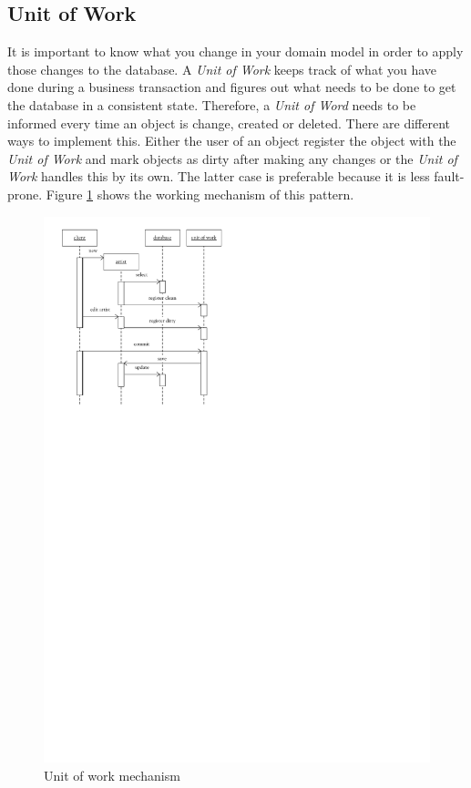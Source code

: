 		\subsection{Unit of Work}
		\label{subsec:unitOfWork}
			It is important to know what you change in your domain model in order to apply those
			changes to the database. A \textit{Unit of Work} keeps track of what you have done
			during a business transaction and figures out what needs to be done to get the
			database in a consistent state. Therefore, a \textit{Unit of Word} needs to be informed
			every time an object is change, created or deleted. There are different ways to
			implement this. Either the user of an object register the object with the 
			\textit{Unit of Work} and mark objects as dirty after making any changes or
			the \textit{Unit of Work} handles this by its own. The latter case is preferable
			because it is less fault-prone. Figure \ref{fig:patternsUnitOfWork} shows the 
			working mechanism of this pattern.
		
			\begin{figure}[htb]
				\begin{center}
					\includegraphics{./files/inc/figures/patternsUnitOfWork}
					\caption{\label{fig:patternsUnitOfWork} Unit of work mechanism}
				\end{center}
			\end{figure}
			

